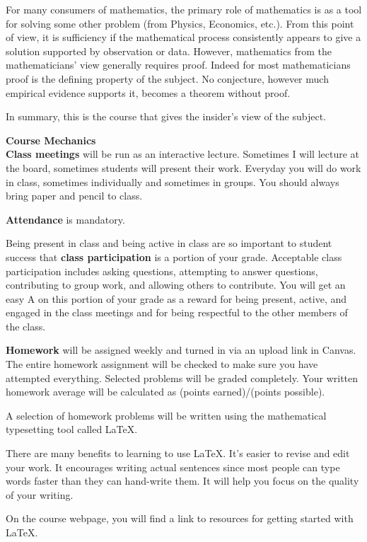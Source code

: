 \documentclass[12pt]{article}
\renewcommand{\emph}[1]{\textsf{\textbf{#1}}}
\newcommand{\localhead}[1]{\par\smallskip\textbf{#1}\nobreak\\}%
\def\heading#1{\localhead{\large\emph{#1}}}
\begin{document}
For many consumers of mathematics, the primary role of mathematics is as a tool for solving some other problem (from Physics, Economics, etc.). From this point of view, it is sufficiency if the mathematical process consistently appears to give a solution supported by observation or data. However, mathematics from the mathematicians' view generally requires proof. Indeed for most mathematicians proof is the defining property of the subject. No conjecture, however much empirical evidence supports it, becomes a theorem without proof.

In summary, this is the course that gives the insider's view of the subject.\\


\heading{Course Mechanics}

\textbf{Class meetings} will be run as an interactive lecture. Sometimes I will lecture at the board, sometimes students will present their work. Everyday you will do work in class, sometimes individually and sometimes in groups. You should always bring paper and pencil to class.

\textbf{Attendance} is mandatory. 

Being present in class and being active in class are so important to student success that \textbf{class participation} is a portion of your grade. Acceptable class participation includes asking questions, attempting to answer questions, contributing to group work, and allowing others to contribute. You will get an easy A on this portion of your grade as a reward for being present, active, and engaged in the class meetings and for being respectful to the other members of the class.

\textbf{Homework} will be assigned weekly and turned in via an upload link in Canvas. The entire homework assignment will be checked to make sure you have attempted everything. Selected problems will be graded completely.  Your written homework average will be calculated as (points earned)/(points possible). 

A selection of homework problems will be written using the mathematical typesetting tool called {\LaTeX}. 

There are many benefits to learning to use \LaTeX. It's easier to revise and edit your work. It encourages writing actual sentences since most people can type words faster than they can hand-write them. It will help you focus on the quality of your writing. 

On the course webpage, you will find a link to resources for getting started with \LaTeX. 
\end{document}
